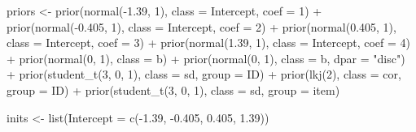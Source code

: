 \documentclass[
  man,floatsintext]{apa7}
\newenvironment{Shaded}{\begin{snugshade}}{\end{snugshade}}
\newcommand{\AttributeTok}[1]{\textcolor[rgb]{0.77,0.63,0.00}{#1}}
\newcommand{\DecValTok}[1]{\textcolor[rgb]{0.00,0.00,0.81}{#1}}
\newcommand{\FloatTok}[1]{\textcolor[rgb]{0.00,0.00,0.81}{#1}}
\newcommand{\FunctionTok}[1]{\textcolor[rgb]{0.00,0.00,0.00}{#1}}
\newcommand{\NormalTok}[1]{#1}
\newcommand{\OtherTok}[1]{\textcolor[rgb]{0.56,0.35,0.01}{#1}}
\newcommand{\SpecialCharTok}[1]{\textcolor[rgb]{0.00,0.00,0.00}{#1}}
\newcommand{\StringTok}[1]{\textcolor[rgb]{0.31,0.60,0.02}{#1}}
\begin{document}
\begin{Shaded}
\begin{Highlighting}[]
\NormalTok{priors }\OtherTok{\textless{}{-}} \FunctionTok{prior}\NormalTok{(}\FunctionTok{normal}\NormalTok{(}\SpecialCharTok{{-}}\FloatTok{1.39}\NormalTok{, }\DecValTok{1}\NormalTok{), }\AttributeTok{class =}\NormalTok{ Intercept, }\AttributeTok{coef =} \DecValTok{1}\NormalTok{) }\SpecialCharTok{+}
  \FunctionTok{prior}\NormalTok{(}\FunctionTok{normal}\NormalTok{(}\SpecialCharTok{{-}}\FloatTok{0.405}\NormalTok{, }\DecValTok{1}\NormalTok{), }\AttributeTok{class =}\NormalTok{ Intercept, }\AttributeTok{coef =} \DecValTok{2}\NormalTok{) }\SpecialCharTok{+}
  \FunctionTok{prior}\NormalTok{(}\FunctionTok{normal}\NormalTok{(}\FloatTok{0.405}\NormalTok{, }\DecValTok{1}\NormalTok{), }\AttributeTok{class =}\NormalTok{ Intercept, }\AttributeTok{coef =} \DecValTok{3}\NormalTok{) }\SpecialCharTok{+}
  \FunctionTok{prior}\NormalTok{(}\FunctionTok{normal}\NormalTok{(}\FloatTok{1.39}\NormalTok{, }\DecValTok{1}\NormalTok{), }\AttributeTok{class =}\NormalTok{ Intercept, }\AttributeTok{coef =} \DecValTok{4}\NormalTok{) }\SpecialCharTok{+}
  \FunctionTok{prior}\NormalTok{(}\FunctionTok{normal}\NormalTok{(}\DecValTok{0}\NormalTok{, }\DecValTok{1}\NormalTok{), }\AttributeTok{class =}\NormalTok{ b) }\SpecialCharTok{+}
  \FunctionTok{prior}\NormalTok{(}\FunctionTok{normal}\NormalTok{(}\DecValTok{0}\NormalTok{, }\DecValTok{1}\NormalTok{), }\AttributeTok{class =}\NormalTok{ b, }\AttributeTok{dpar =} \StringTok{"disc"}\NormalTok{) }\SpecialCharTok{+}
  \FunctionTok{prior}\NormalTok{(}\FunctionTok{student\_t}\NormalTok{(}\DecValTok{3}\NormalTok{, }\DecValTok{0}\NormalTok{, }\DecValTok{1}\NormalTok{), }\AttributeTok{class =}\NormalTok{ sd, }\AttributeTok{group =}\NormalTok{ ID) }\SpecialCharTok{+}
  \FunctionTok{prior}\NormalTok{(}\FunctionTok{lkj}\NormalTok{(}\DecValTok{2}\NormalTok{), }\AttributeTok{class =}\NormalTok{ cor, }\AttributeTok{group =}\NormalTok{ ID) }\SpecialCharTok{+}
  \FunctionTok{prior}\NormalTok{(}\FunctionTok{student\_t}\NormalTok{(}\DecValTok{3}\NormalTok{, }\DecValTok{0}\NormalTok{, }\DecValTok{1}\NormalTok{), }\AttributeTok{class =}\NormalTok{ sd, }\AttributeTok{group =}\NormalTok{ item)}


\NormalTok{inits }\OtherTok{\textless{}{-}} \FunctionTok{list}\NormalTok{(}\AttributeTok{Intercept =} \FunctionTok{c}\NormalTok{(}\SpecialCharTok{{-}}\FloatTok{1.39}\NormalTok{, }\SpecialCharTok{{-}}\FloatTok{0.405}\NormalTok{, }\FloatTok{0.405}\NormalTok{, }\FloatTok{1.39}\NormalTok{))}


\end{Highlighting}
\end{Shaded}
\end{document}
